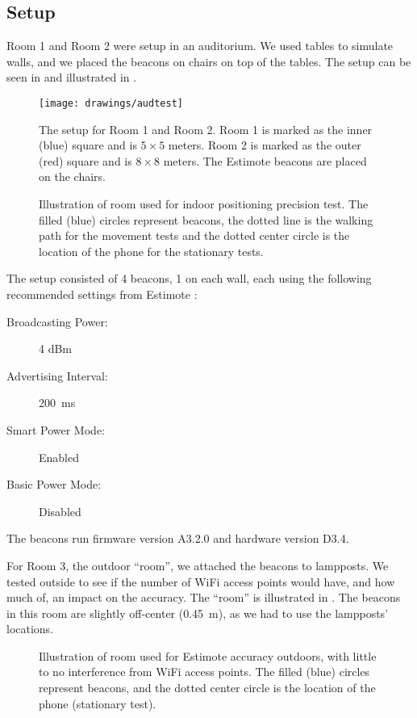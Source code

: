 \subsection{Setup}\label{sec:setup}
Room 1 and Room 2 were setup in an auditorium. 
We used tables to simulate walls, 
and we placed the beacons on chairs on top of the tables. 
The setup can be seen in  and illustrated in . 
\begin{figure}[!htb]
  \centering
  \texttt{[image: drawings/audtest]}
  \caption{The setup for Room 1 and Room 2. Room 1 is marked as the inner (blue) square and is $5 \times 5$ meters. Room 2 is marked as the outer (red) square and is $8 \times 8$ meters. The Estimote beacons are placed on the chairs.}
  \label{fig:audtest}
\end{figure}

\begin{figure}[!htb]
  \centering
  
  \caption{Illustration of room used for indoor positioning precision test. The filled (blue) circles represent beacons, the dotted line is the walking path for the movement tests and the dotted center circle is the location of the phone for the stationary tests.}
  \label{fig:precisiontest:illustration}
\end{figure}

The setup consisted of \num{4} beacons, \num{1} on each wall, 
each using the following recommended settings from Estimote \cite{estimote:settings}:
\begin{description}
  \item[Broadcasting Power:]{\num{4} dBm}
  \item[Advertising Interval:]{\SI{200}{\milli\second}}
  \item[Smart Power Mode:]{Enabled}
  \item[Basic Power Mode:]{Disabled}
\end{description}
The beacons run firmware version A3.2.0 and hardware version D3.4.

For Room 3, the outdoor ``room'',
we attached the beacons to lampposts. 
We tested outside to see if the number of WiFi access points would have, and how much of, 
an impact on the accuracy. 
The ``room'' is illustrated in . 
The beacons in this room are slightly off-center (\SI{0.45}{\meter}), 
as we had to use the lampposts' locations. 

\begin{figure}[!htb]
  \centering
  
  \caption{Illustration of room used for Estimote accuracy outdoors, with little to no interference from WiFi access points. The filled (blue) circles represent beacons, and the dotted center circle is the location of the phone (stationary test).}
  \label{fig:outdoortest}
\end{figure}

